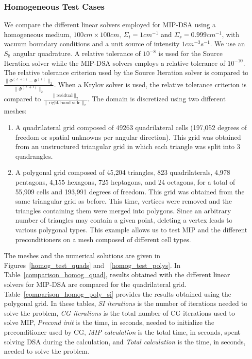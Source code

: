 \documentclass[preprint,10pt]{elsarticle}
\renewcommand{\(}{\left(}
\renewcommand{\)}{\right)}
\renewcommand{\[}{\left[}
\renewcommand{\]}{\right]}
\begin{document}
\subsubsection{Homogeneous Test Cases}  \label{sec_homog}

We compare the different linear solvers employed for MIP-DSA using a homogeneous medium, $100cm
\times 100cm$, $\Sigma_t = 1cm^{-1}$ and $\Sigma_s = 0.999cm^{-1}$, with
vacuum boundary conditions and a unit source of intensity $1cm^{-3}s^{-1}$. We
use an $S_8$ angular quadrature. A relative tolerance of $10^{-8}$ is used for the Source Iteration solver
while the MIP-DSA solvers employs a relative tolerance of $10^{-10}$. The
relative tolerance criterion used by the Source Iteration solver is compared to
$\frac{\|\Phi^{(\ell+1)}-\Phi^{(\ell)}\|_2}{\|\Phi^{(\ell+1)}\|_2}$. When a Krylov solver
is used, the relative tolerance criterion is compared to
$\frac{\|\textrm{residual}\|_2}{\|\textrm{right hand side}\|_2}$.
The domain is discretized using two different meshes:
\begin{enumerate}
  \item A quadrilateral grid composed of 49263 quadrilateral
    cells (197,052 degrees of freedom or spatial unknowns per angular direction). This grid was 
		obtained from an unstructured triangular grid in which each triangle was split into 3 quadrangles.
  \item A polygonal grid composed of 45,204 triangles, 823
    quadrilaterals, 4,978 pentagons, 4,155 hexagons, 725 heptagons, and 24
    octagons, for a total of 55,909 cells and 193,991 degrees of freedom. This grid was obtained 
		from the same triangular grid as before. This time, vertices were removed and the triangles 
		containing them were merged into polygons. Since an arbitrary number of triangles may contain 
		a given point, deleting a vertex leads to various polygonal types. This
    example allows us to test MIP and the different preconditioners on a
    mesh composed of different cell types.
\end{enumerate}
%
The meshes and the numerical solutions are given in Figures~\ref {homog_test_quads} and~ \ref {homog_test_polys}.
In Table~\ref {comparison_homog_quad}, results obtained with the different linear solvers for MIP-DSA 
are compared for the quadrilateral grid. Table~\ref{comparison_homog_poly_si} provides the results obtained using the polygonal grid.
In these tables, 
{\it SI iterations} is the number of iterations  needed to solve the problem, 
{\it CG iterations} is the total number of CG iterations used to solve MIP,
{\it Precond init} is the time, in seconds, needed to initialize the preconditioner used by CG, 
{\it MIP calculation} is the total time, in seconds, spent solving DSA during the calculation, and 
{\it Total calculation} is the time, in seconds, needed to solve the problem. 
\end{document}
